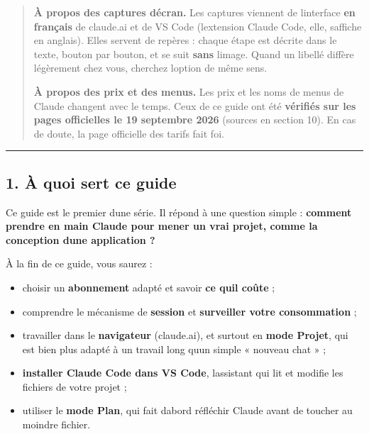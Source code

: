 \documentclass[
  french,
  11pt,
  a4paper,
]{article}
\providecommand{\tightlist}{%
  \setlength{\itemsep}{0pt}\setlength{\parskip}{0pt}}
\begin{document}
\begin{quote}
\textbf{À propos des captures d\textquotesingle écran.} Les captures
viennent de l\textquotesingle interface \textbf{en français} de
claude.ai et de VS Code (l\textquotesingle extension Claude Code, elle,
s\textquotesingle affiche en anglais). Elles servent de repères : chaque
étape est décrite dans le texte, bouton par bouton, et se suit
\textbf{sans} l\textquotesingle image. Quand un libellé diffère
légèrement chez vous, cherchez l\textquotesingle option de même sens.

\textbf{À propos des prix et des menus.} Les prix et les noms de menus
de Claude changent avec le temps. Ceux de ce guide ont été
\textbf{vérifiés sur les pages officielles le 19 septembre 2026}
(sources en section 10). En cas de doute, la page officielle des tarifs
fait foi.
\end{quote}

\begin{center}\rule{0.5\linewidth}{0.5pt}\end{center}

\subsection{1. À quoi sert ce guide}\label{1-uxe0-quoi-sert-ce-guide}

Ce guide est le premier d\textquotesingle une série. Il répond à une
question simple : \textbf{comment prendre en main Claude pour mener un
vrai projet, comme la conception d\textquotesingle une application ?}

À la fin de ce guide, vous saurez :

\begin{itemize}
\tightlist
\item
  choisir un \textbf{abonnement} adapté et savoir \textbf{ce
  qu\textquotesingle il coûte} ;
\item
  comprendre le mécanisme de \textbf{session} et \textbf{surveiller
  votre consommation} ;
\item
  travailler dans le \textbf{navigateur} (claude.ai), et surtout en
  \textbf{mode Projet}, qui est bien plus adapté à un travail long
  qu\textquotesingle un simple « nouveau chat » ;
\item
  \textbf{installer Claude Code dans VS Code},
  l\textquotesingle assistant qui lit et modifie les fichiers de votre
  projet ;
\item
  utiliser le \textbf{mode Plan}, qui fait d\textquotesingle abord
  réfléchir Claude avant de toucher au moindre fichier.
\end{itemize}
\end{document}
